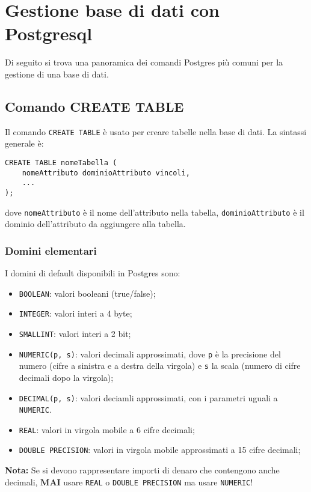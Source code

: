 \documentclass[a4paper, 10pt]{article}
\begin{document}
	\begin{frontespizio}
		\Preambolo{\usepackage{datetime}}
	\end{frontespizio}

	\tableofcontents
		
	\newpage
	
	\section{Gestione base di dati con Postgresql}
	Di seguito si trova una panoramica dei comandi Postgres più comuni per la gestione di una base di dati.
	
	\subsection{Comando CREATE TABLE}
	Il comando \lstinline{CREATE TABLE} è usato per creare tabelle nella base di dati.
	La sintassi generale è:
	\begin{lstlisting}
CREATE TABLE nomeTabella (
	nomeAttributo dominioAttributo vincoli,
	...
);
	\end{lstlisting}
	dove \lstinline|nomeAttributo| è il nome dell'attributo nella tabella, \lstinline|dominioAttributo| è il dominio dell'attributo da aggiungere alla tabella.
	
	\subsubsection{Domini elementari}
	I domini di default disponibili in Postgres sono:
	\begin{itemize}
		\item \lstinline|BOOLEAN|: valori booleani (true/false);
		\item \lstinline|INTEGER|: valori interi a 4 byte;
		\item \lstinline|SMALLINT|: valori interi a 2 bit;
		\item \lstinline|NUMERIC(p, s)|: valori decimali approssimati, dove \lstinline|p| è la precisione del numero (cifre a sinistra e a destra della virgola) e \lstinline|s| la scala (numero di cifre decimali dopo la virgola);
		\item \lstinline|DECIMAL(p, s)|: valori deciamli approssimati, con i parametri uguali a \lstinline|NUMERIC|.
		\item \lstinline|REAL|: valori in virgola mobile a 6 cifre decimali;
		\item \lstinline|DOUBLE PRECISION|: valori in virgola mobile approssimati a 15 cifre decimali;
	\end{itemize}
	\textbf{Nota:} Se si devono rappresentare importi di denaro che contengono anche
	decimali, \textbf{MAI} usare \lstinline|REAL| o \lstinline|DOUBLE PRECISION| ma usare \lstinline|NUMERIC|!
\end{document}
